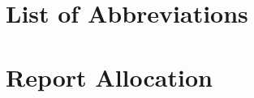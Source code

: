 \section{List of Abbreviations}
\renewcommand{\nomname}{}
\printnomenclature

\clearpage
\section{Report Allocation}
